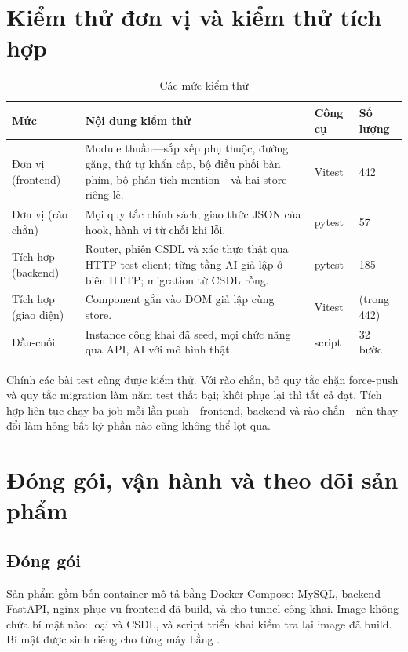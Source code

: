 \documentclass[../main.tex]{subfiles}
\begin{document}
\section{Kiểm thử đơn vị và kiểm thử tích hợp}
\begin{table}[H]
\centering
\caption{Các mức kiểm thử}\label{tab:levels}
\renewcommand{\arraystretch}{1.2}
\begin{tabular}{|p{2.6cm}|p{7.5cm}|p{2.0cm}|p{1.5cm}|}
\hline
\textbf{Mức} & \textbf{Nội dung kiểm thử} & \textbf{Công cụ} & \textbf{Số lượng} \\ \hline
Đơn vị (frontend) & Module thuần---sắp xếp phụ thuộc, đường găng, thứ tự khẩn cấp, bộ điều phối bàn phím, bộ phân tích mention---và hai store riêng lẻ. & Vitest & 442 \\ \hline
Đơn vị (rào chắn) & Mọi quy tắc chính sách, giao thức JSON của hook, hành vi từ chối khi lỗi. & pytest & 57 \\ \hline
Tích hợp (backend) & Router, phiên CSDL và xác thực thật qua HTTP test client; từng tầng AI giả lập ở biên HTTP; migration từ CSDL rỗng. & pytest & 185 \\ \hline
Tích hợp (giao diện) & Component gắn vào DOM giả lập cùng store. & Vitest & (trong 442) \\ \hline
Đầu-cuối & Instance công khai đã seed, mọi chức năng qua API, AI với mô hình thật. & script & 32 bước \\ \hline
\end{tabular}
\end{table}
Chính các bài test cũng được kiểm thử. Với rào chắn, bỏ quy tắc chặn force-push và quy tắc
migration làm năm test thất bại; khôi phục lại thì tất cả đạt. Tích hợp liên tục chạy ba job mỗi lần
push---frontend, backend và rào chắn---nên thay đổi làm hỏng bất kỳ phần nào cũng không thể lọt qua.

\section{Đóng gói, vận hành và theo dõi sản phẩm}
\subsection{Đóng gói}
Sản phẩm gồm bốn container mô tả bằng Docker Compose: MySQL, backend FastAPI, nginx phục vụ frontend
đã build, và  cho tunnel công khai. Image không chứa bí mật nào: 
loại  và CSDL, và script triển khai kiểm tra lại image đã build. Bí mật được sinh riêng cho
từng máy bằng .
\end{document}
